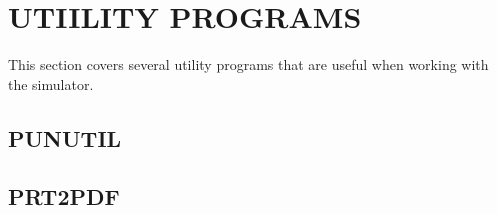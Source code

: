 \section[Utility Programs]{UTIILITY PROGRAMS}

This section covers several utility programs that are useful when working with the simulator.

\subsection[punutil]{PUNUTIL}


\subsection[prt2pdf]{PRT2PDF}
